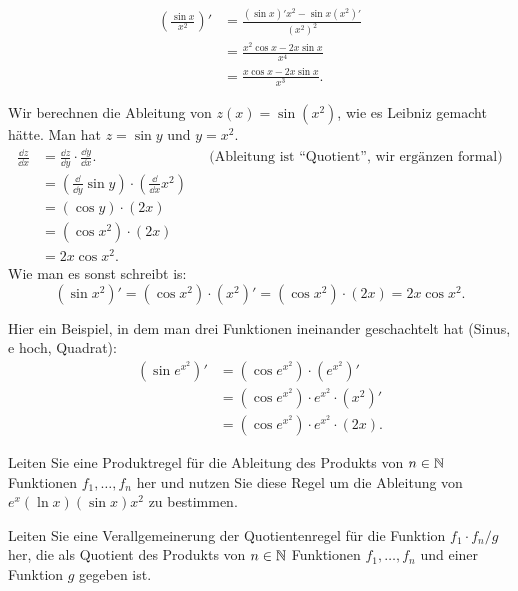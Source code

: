 \begin{bsp}[zu Quotientenregel]
	\begin{align*}
		\left( \frac{\sin x}{x^2} \right)' & = \frac{ (\sin x)'   x^2 - \sin x (x^2)'}{(x^2)^2} 
		\\ & = \frac{x^2 \cos x - 2 x \sin x}{x^4}
		\\ & = \frac{ x \cos x - 2 x \sin x}{x^3}. 
	\end{align*}
\end{bsp} 

\begin{bsp}
	Wir berechnen die Ableitung von $z(x) = \sin (x^2)$, wie es Leibniz gemacht hätte. Man hat $z = \sin y$ und $y = x^2$. 
	\begin{align*}
		\frac{\dd z}{\dd x} & = \frac{\dd z}{\dd y} \cdot \frac{\dd y}{\dd x}. &  & \text{(Ableitung ist ``Quotient'', wir ergänzen formal)}
		\\ & = (\frac{\dd}{\dd y} \sin y) \cdot (\frac{\dd}{\dd x} x^2)
		\\ & = (\cos y) \cdot (2 x)
		\\ & = (\cos x^2) \cdot (2 x)
		\\ & = 2 x \cos x^2.
	\end{align*}
	Wie man es sonst schreibt is:
	\[
		(\sin x^2)' = (\cos x^2) \cdot (x^2)' = (\cos x^2) \cdot (2 x) = 2 x \cos x^2. 
	\]
\end{bsp} 

\begin{bsp}
	Hier ein Beispiel, in dem man drei Funktionen ineinander geschachtelt hat (Sinus, e hoch, Quadrat): 
	\begin{align*}
		(\sin e^{x^2})' & = (\cos e^{x^2} ) \cdot (e^{x^2})' 
		\\ & = (\cos e^{x^2} ) \cdot e^{x^2} \cdot (x^2)' 
		\\ & = (\cos e^{x^2} ) \cdot e^{x^2} \cdot (2 x ). 
	\end{align*}
\end{bsp}

\begin{aufg}
	Leiten Sie eine Produktregel für die Ableitung des Produkts von $n \in \mathbb{N}$ Funktionen $f_1,\ldots, f_n$ her und nutzen Sie diese Regel um die Ableitung von $e^x (\ln x) (\sin x) x^2$ zu bestimmen. 
\end{aufg} 

\begin{aufg}
	Leiten Sie eine Verallgemeinerung der Quotientenregel für die Funktion $f_1 \cdot f_n / g$ her, die als Quotient des Produkts von $n \in \mathbb{N}$ Funktionen $f_1,\ldots,f_n$ und einer Funktion $g$ gegeben ist. 
\end{aufg} 


